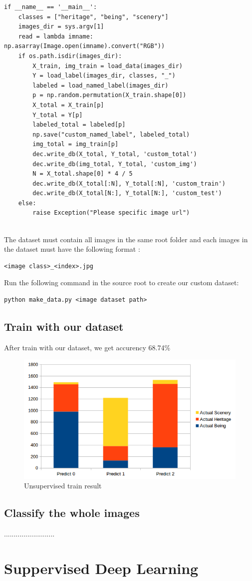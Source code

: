 \documentclass[hidelinks,12pt,a4paper]{report}
\begin{document}
\begin{lstlisting}
if __name__ == '__main__':
    classes = ["heritage", "being", "scenery"]
    images_dir = sys.argv[1]
    read = lambda imname: np.asarray(Image.open(imname).convert("RGB"))
    if os.path.isdir(images_dir):
        X_train, img_train = load_data(images_dir)
        Y = load_label(images_dir, classes, "_")
        labeled = load_named_label(images_dir)
        p = np.random.permutation(X_train.shape[0])
        X_total = X_train[p]
        Y_total = Y[p]
        labeled_total = labeled[p]
        np.save("custom_named_label", labeled_total)
        img_total = img_train[p]
        dec.write_db(X_total, Y_total, 'custom_total')
        dec.write_db(img_total, Y_total, 'custom_img')
        N = X_total.shape[0] * 4 / 5
        dec.write_db(X_total[:N], Y_total[:N], 'custom_train')
        dec.write_db(X_total[N:], Y_total[N:], 'custom_test')
    else:
        raise Exception("Please specific image url")


\end{lstlisting}
The dataset must contain all images in the same root folder and each images in the dataset must have the following format :
\begin{verbatim}
<image class>_<index>.jpg
\end{verbatim}
Run the following command in the source root to create our custom dataset: 
\begin{verbatim}
python make_data.py <image dataset path>
\end{verbatim}
\subsection{Train with our dataset}
After train with our dataset, we get accurency 68.74\%

\begin{figure}[H]
\centering
\includegraphics[width=1\textwidth]{images/unsupervised_large_dataset_result}
\caption{Unsupervised train result}
\end{figure}

\subsection{Classify the whole images}
..........................
\section{Suppervised Deep Learning}




\end{document}
